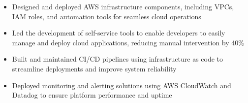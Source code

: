 \par\bigskip
{}
\par\smallskip
\begin{minipage}{13.75cm}
  \begin{minipage}{6.5cm}
    \begin{itemize}
      \item Designed and deployed AWS infrastructure components, including VPCs, IAM roles, and automation tools for seamless cloud operations
      \item Led the development of self-service tools to enable developers to easily manage and deploy cloud applications, reducing manual intervention by 40\%
    \end{itemize}
  \end{minipage}
  \hfill
  \begin{minipage}{6.5cm}
    \begin{itemize}
      \item Built and maintained CI/CD pipelines using infrastructure as code to streamline deployments and improve system reliability
      \item Deployed monitoring and alerting solutions using AWS CloudWatch and Datadog to ensure platform performance and uptime
    \end{itemize}
  \end{minipage}
\end{minipage}
\par\smallskip
\divider


